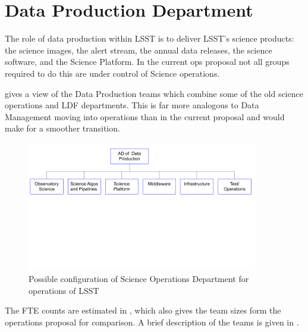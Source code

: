 
\section{Data Production Department }\label{sec:sciops} \label{sec:dataprod}

The role of data production within \gls{LSST} is to deliver \gls{LSST}'s science products: the science images, the alert stream, the annual data releases, the science \gls{software}, and the Science Platform. In the current ops proposal not all groups required to do this are under control of Science operations.

 gives a view of the Data Production teams which combine some of the old science operations  and \gls{LDF} departments. This is far more analogous to Data Management moving into operations than in the current proposal and would make for a smoother transition.

\begin{figure}
\begin{center}
\includegraphics[width=0.9\textwidth,trim=0cm 10cm 0 0, clip]{figures/SciOpsOrg}
\caption{Possible configuration of Science Operations Department for operations of \gls{LSST} \label{fig:sciopsorg}}
\end{center}
\end{figure}

The \gls{FTE} counts are estimated in , which also gives the team sizes form the operations proposal for comparison.
A brief description of the teams is given in .





